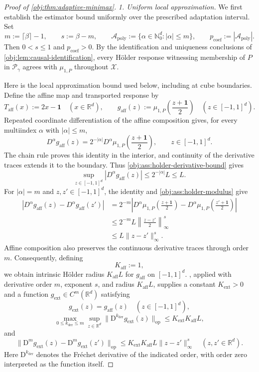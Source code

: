 \documentclass[11pt]{article}
\begin{document}
\begin{proof}[Proof of \cref{obj:thm:adaptive-minimax}]
\emph{1. Uniform local approximation.}
We first establish the estimator bound uniformly over the prescribed adaptation interval. Set
\[
m:=\lceil\beta\rceil-1,\qquad
s:=\beta-m,\qquad
\mathcal A_{\mathrm{poly}}
:=\{\alpha\in\mathbb N_0^d:|\alpha|\le m\},
\qquad
p_{\mathrm{coef}}:=|\mathcal A_{\mathrm{poly}}|.
\]
Then \(0<s\le1\) and \(p_{\mathrm{coef}}>0\). By the identification and uniqueness conclusions of \cref{obj:lem:causal-identification}, every Hölder response witnessing membership of \(P\) in \(\mathcal P_\gamma\) agrees with \(\mu_{1,P}\) throughout \(\mathcal X\).

Here is the local approximation bound used below, including at cube boundaries. Define the affine map and transported response by
\[
T_{\mathrm{aff}}(x):=2x-\mathbf1
\quad(x\in\mathbb R^d),
\qquad
g_{\mathrm{aff}}(z)
:=\mu_{1,P}\!\left(\frac{z+\mathbf1}{2}\right)
\quad(z\in[-1,1]^d).
\]
Repeated coordinate differentiation of the affine composition gives, for every multiindex \(\alpha\) with \(|\alpha|\le m\),
\[
D^\alpha g_{\mathrm{aff}}(z)
=
2^{-|\alpha|}D^\alpha\mu_{1,P}\!\left(\frac{z+\mathbf1}{2}\right),
\qquad z\in[-1,1]^d.
\]
The chain rule proves this identity in the interior, and continuity of the derivative traces extends it to the boundary. Thus \cref{obj:ass:holder-derivative-bound} gives
\[
\sup_{z\in[-1,1]^d}|D^\alpha g_{\mathrm{aff}}(z)|
\le 2^{-|\alpha|}L\le L.
\]
For \(|\alpha|=m\) and \(z,z'\in[-1,1]^d\), the identity and \cref{obj:ass:holder-modulus} give
\[
\begin{aligned}
|D^\alpha g_{\mathrm{aff}}(z)-D^\alpha g_{\mathrm{aff}}(z')|
&=2^{-m}\left|
D^\alpha\mu_{1,P}\!\left(\frac{z+\mathbf1}{2}\right)
-D^\alpha\mu_{1,P}\!\left(\frac{z'+\mathbf1}{2}\right)
\right|
\\
&\le 2^{-m}L
\left\|\frac{z-z'}2\right\|_\infty^s
\\
&\le L\|z-z'\|_\infty^s.
\end{aligned}
\]
Affine composition also preserves the continuous derivative traces through order \(m\). Consequently, defining
\[
K_{\mathrm{aff}}:=1,
\]
we obtain intrinsic Hölder radius \(K_{\mathrm{aff}}L\) for \(g_{\mathrm{aff}}\) on \([-1,1]^d\). , applied with derivative order \(m\), exponent \(s\), and radius \(K_{\mathrm{aff}}L\), supplies a constant \(K_{\mathrm{ext}}>0\) and a function \(g_{\mathrm{ext}}\in C^m(\mathbb R^d)\) satisfying
\[
g_{\mathrm{ext}}(z)=g_{\mathrm{aff}}(z)
\quad(z\in[-1,1]^d),
\]
\[
\max_{0\le k_{\mathrm{der}}\le m}
\sup_{z\in\mathbb R^d}
\|\mathrm D^{k_{\mathrm{der}}}g_{\mathrm{ext}}(z)\|_{\mathrm{op}}
\le K_{\mathrm{ext}}K_{\mathrm{aff}}L,
\]
and
\[
\|\mathrm D^m g_{\mathrm{ext}}(z)
-\mathrm D^m g_{\mathrm{ext}}(z')\|_{\mathrm{op}}
\le
K_{\mathrm{ext}}K_{\mathrm{aff}}L
\|z-z'\|_\infty^s
\quad(z,z'\in\mathbb R^d).
\]
Here \(\mathrm D^{k_{\mathrm{der}}}\) denotes the Fréchet derivative of the indicated order, with order zero interpreted as the function itself.


\end{proof}
\end{document}
